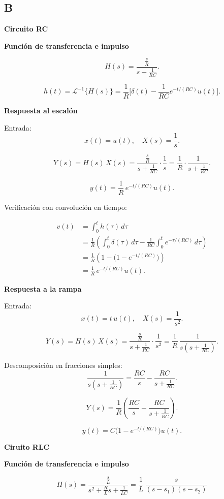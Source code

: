 \subsection{B}

\textbf{Circuito RC}

\textbf{Función de transferencia e impulso}

\[
H(s) = \frac{\tfrac{s}{R}}{s+\tfrac{1}{RC}}.
\]

\[
h(t) = \mathscr{L}^{-1}\{H(s)\} 
= \frac{1}{R}\Big[\delta(t)-\frac{1}{RC}e^{-t/(RC)}u(t)\Big].
\]

\textbf{Respuesta al escalón}

Entrada:
\[
x(t)=u(t), \quad X(s)=\frac{1}{s}.
\]

\[
Y(s) = H(s)\,X(s) 
= \frac{\tfrac{s}{R}}{s+\tfrac{1}{RC}} \cdot \frac{1}{s}
= \frac{1}{R}\cdot \frac{1}{s+\tfrac{1}{RC}}.
\]

\[
y(t) = \frac{1}{R}\,e^{-t/(RC)}u(t).
\]

Verificación con convolución en tiempo:

\begin{align*}
v(t) &= \int_{0}^{t} h(\tau)\,d\tau \\
     &= \frac{1}{R}\left( \int_{0}^{t}\delta(\tau)\,d\tau 
     - \frac{1}{RC}\int_{0}^{t} e^{-\tau/(RC)}\,d\tau \right) \\
     &= \frac{1}{R}\left(1 - \big(1-e^{-t/(RC)}\big)\right) \\
     &= \frac{1}{R}\,e^{-t/(RC)}u(t).
\end{align*}

\textbf{Respuesta a la rampa}

Entrada:
\[
x(t)=t\,u(t), \quad X(s)=\frac{1}{s^2}.
\]

\[
Y(s) = H(s)\,X(s) 
= \frac{\tfrac{s}{R}}{s+\tfrac{1}{RC}} \cdot \frac{1}{s^2}
= \frac{1}{R}\,\frac{1}{s(s+\tfrac{1}{RC})}.
\]

Descomposición en fracciones simples:
\[
\frac{1}{s(s+\tfrac{1}{RC})} = \frac{RC}{s} - \frac{RC}{s+\tfrac{1}{RC}}.
\]

\[
Y(s)=\frac{1}{R}\left(\frac{RC}{s}-\frac{RC}{s+\tfrac{1}{RC}}\right).
\]

\[
y(t) = C\big(1-e^{-t/(RC)}\big)u(t).
\]

\textbf{Ciruito RLC}

\textbf{Función de transferencia e impulso}

\[
H(s) = \frac{\tfrac{s}{L}}{s^2+\tfrac{R}{L}s+\tfrac{1}{LC}}
= \frac{1}{L}\,\frac{s}{(s-s_1)(s-s_2)}
\]

